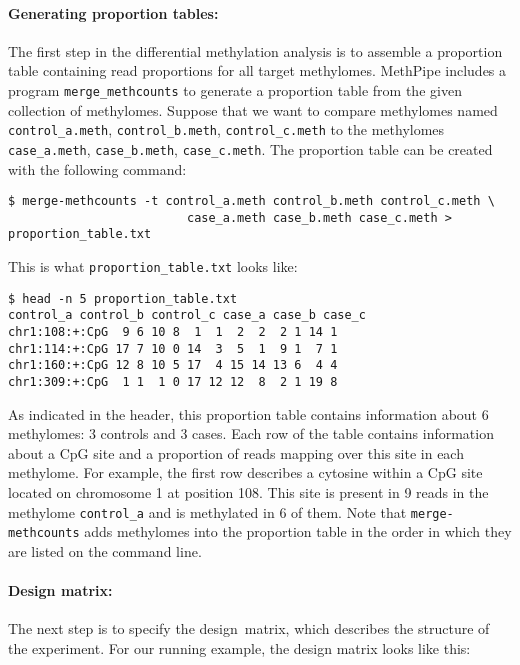 \documentclass[10pt]{article}
\newcommand{\prog}[1]{\texttt{#1}}
\begin{document}
\paragraph{Generating proportion tables:} The first step in the differential 
methylation analysis is to assemble a proportion table containing read 
proportions for all target methylomes. MethPipe includes a program 
\prog{merge\_methcounts} to generate a proportion table from the given collection of 
methylomes. Suppose that we want to compare methylomes named 
{\tt control\_a.meth}, {\tt control\_b.meth}, {\tt control\_c.meth}
to the methylomes {\tt case\_a.meth}, {\tt case\_b.meth}, 
{\tt case\_c.meth}. The proportion table can be created with the following 
command:

{\small{%
\begin{verbatim}
$ merge-methcounts -t control_a.meth control_b.meth control_c.meth \
                         case_a.meth case_b.meth case_c.meth > proportion_table.txt
\end{verbatim}%
}}

This is what {\tt proportion\_table.txt} looks like:

{\small{%
\begin{verbatim}
$ head -n 5 proportion_table.txt
control_a control_b control_c case_a case_b case_c
chr1:108:+:CpG  9 6 10 8  1  1  2  2  2 1 14 1
chr1:114:+:CpG 17 7 10 0 14  3  5  1  9 1  7 1
chr1:160:+:CpG 12 8 10 5 17  4 15 14 13 6  4 4
chr1:309:+:CpG  1 1  1 0 17 12 12  8  2 1 19 8
\end{verbatim}%
}}

As indicated in the header, this proportion table contains information about 6
methylomes: 3 controls and 3 cases. Each row of the table contains information
about a CpG site and a proportion of reads mapping over this site in each
methylome. For example, the first row describes a cytosine within a CpG site
located on chromosome 1 at position 108. This site is present in 9 reads in the
methylome {\tt control\_a} and is methylated in 6 of them. Note that 
\prog{merge-methcounts} adds methylomes into the proportion table in the order 
in which they are listed on the command line.

\paragraph{Design matrix:} The next step is to specify the design\ matrix, which
describes the structure of the experiment. For our running example, the design
matrix looks like this:
\end{document}
